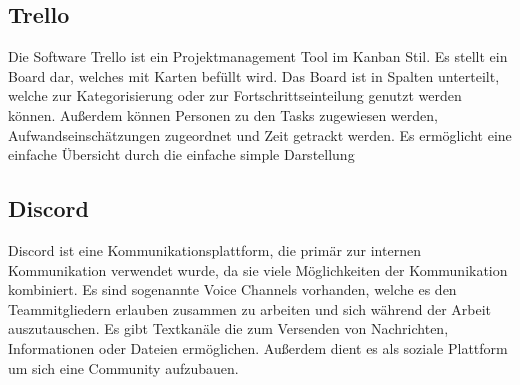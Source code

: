\subsection{Trello}\label{subsec:Trello}
%
Die Software Trello ist ein Projektmanagement Tool im Kanban Stil. Es stellt ein Board dar, welches mit Karten befüllt wird.
Das Board ist in Spalten unterteilt, welche zur Kategorisierung oder zur Fortschrittseinteilung genutzt werden können.
Außerdem können Personen zu den Tasks zugewiesen werden, Aufwandseinschätzungen zugeordnet und Zeit getrackt werden.
Es ermöglicht eine einfache Übersicht durch die einfache simple Darstellung
%
\subsection{Discord}\label{subsec:Discord}
Discord ist eine Kommunikationsplattform, die primär zur internen Kommunikation verwendet wurde, da sie viele Möglichkeiten der Kommunikation kombiniert.
Es sind sogenannte Voice Channels vorhanden, welche es den Teammitgliedern erlauben zusammen zu arbeiten und sich während der Arbeit auszutauschen.
Es gibt Textkanäle die zum Versenden von Nachrichten, Informationen oder Dateien ermöglichen. Außerdem dient es als soziale Plattform um sich eine Community aufzubauen.

%

\renewcommand{\kapitelautor}{}
